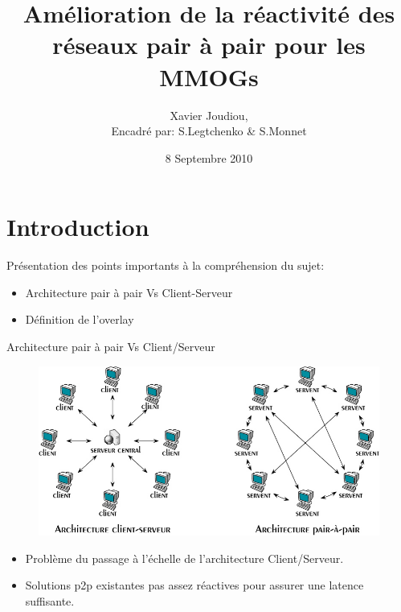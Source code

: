 \documentclass{beamer}
\title{Amélioration de la réactivité des réseaux pair à pair pour les MMOGs}
\author{Xavier Joudiou,\\\tiny{Encadré par: S.Legtchenko \& S.Monnet}}\institute{Université Paris VI, Master SAR}
\date{8 Septembre 2010}
\begin{document}
  \begin{frame}
  \maketitle
  \end{frame}


  \begin{frame}
  \tableofcontents
  \end{frame}

  \section{Introduction}
  \begin{frame}
  	Présentation des points importants à la compréhension du sujet:\\
	\begin{itemize}
		\item Architecture pair à pair Vs Client-Serveur\\
		\item Définition de l'overlay\\
	\end{itemize}
  \end{frame}

  \begin{frame}
	Architecture pair à pair Vs Client/Serveur\\
	\begin{figure}
	\includegraphics[scale=0.28]{./Ressources/Images/p2p-85145.png}\\
        \label{P2PvsClServ}
        \end{figure}
	\begin{itemize}
		\item Problème du passage à l'échelle de l'architecture Client/Serveur.\\
		\item Solutions p2p existantes pas assez réactives pour assurer une latence suffisante.\\
	\end{itemize}
  \end{frame}
  
\end{document}
